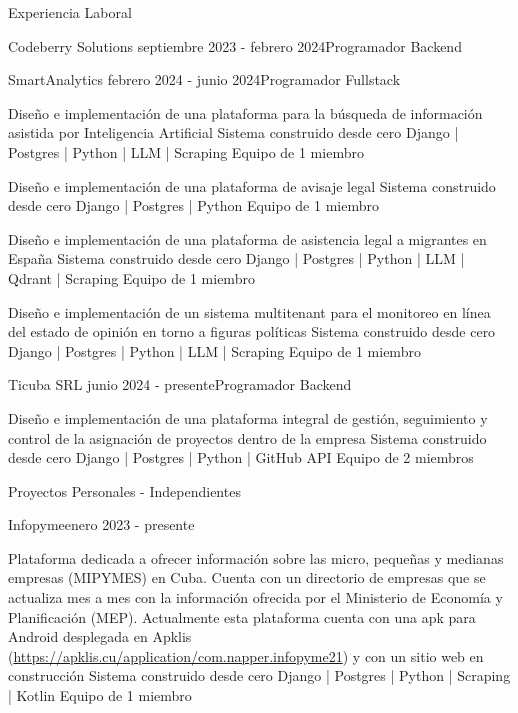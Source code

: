 \documentclass{resume}
\begin{document}
\begin{rSection}{Experiencia Laboral}
\begin{rSubsection}{Codeberry Solutions}{ septiembre 2023 - febrero 2024}{Programador Backend}{}
		\end{rSubsection}	
		
		\begin{rSubsection}{SmartAnalytics}{ febrero 2024 - junio 2024}{Programador Fullstack}{}
			\item Diseño e implementación de una plataforma para la búsqueda de información asistida por Inteligencia Artificial
				\subitem Sistema construido desde cero
				\subitem Django | Postgres | Python | LLM | Scraping
				\subitem Equipo de 1 miembro
			\item Diseño e implementación de una plataforma de avisaje legal
				\subitem Sistema construido desde cero
				\subitem Django | Postgres | Python
				\subitem Equipo de 1 miembro
			\item Diseño e implementación de una plataforma de asistencia legal a migrantes en España
				\subitem Sistema construido desde cero
				\subitem Django | Postgres | Python | LLM | Qdrant | Scraping
				\subitem Equipo de 1 miembro
			\item Diseño e implementación de un sistema multitenant para el monitoreo en línea del estado de opinión en torno a figuras políticas
				\subitem Sistema construido desde cero
				\subitem Django | Postgres | Python | LLM | Scraping
				\subitem Equipo de 1 miembro
			
		\end{rSubsection}	
		
		\begin{rSubsection}{Ticuba SRL}{ junio 2024 - presente}{Programador Backend}{}
			\item Diseño e implementación de una plataforma integral de gestión, seguimiento y control de la asignación de proyectos dentro de la empresa
			\subitem Sistema construido desde cero
			\subitem Django | Postgres | Python | GitHub API
			\subitem Equipo de 2 miembros
			
			
		\end{rSubsection}
		
	\end{rSection}

	\begin{rSection}{Proyectos Personales - Independientes}
		\begin{rSubsection}{Infopyme}{enero 2023 - presente}{}
			\item  Plataforma dedicada a ofrecer información sobre las micro, pequeñas y medianas empresas (MIPYMES) en Cuba. Cuenta con un directorio de empresas que se actualiza mes a mes con la información ofrecida por el Ministerio de Economía y Planificación (MEP). Actualmente esta plataforma cuenta con una apk para Android desplegada en Apklis
			(\href{https://apklis.cu/application/com.napper.infopyme21}{https://apklis.cu/application/com.napper.infopyme21}) y con un sitio web en construcción
				\subitem Sistema construido desde cero
				\subitem Django | Postgres | Python | Scraping | Kotlin
				\subitem Equipo de 1 miembro
		\end{rSubsection}	
	\end{rSection}
	
\end{document}
